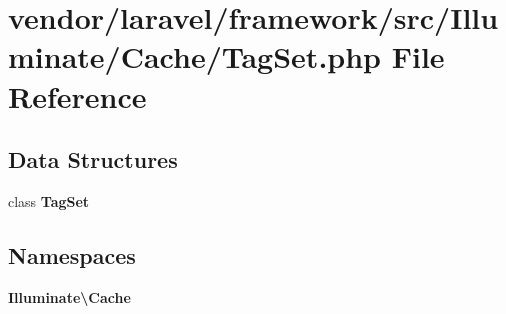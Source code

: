 \section{vendor/laravel/framework/src/\+Illuminate/\+Cache/\+Tag\+Set.php File Reference}
\label{_tag_set_8php}
\subsection*{Data Structures}
\begin{DoxyCompactItemize}
\item 
class {\bf Tag\+Set}
\end{DoxyCompactItemize}
\subsection*{Namespaces}
\begin{DoxyCompactItemize}
\item 
 {\bf Illuminate\textbackslash{}\+Cache}
\end{DoxyCompactItemize}
